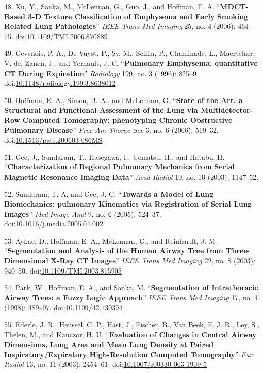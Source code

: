\documentclass[11pt,]{article}
\begin{document}
48. Xu, Y., Sonka, M., McLennan, G., Guo, J., and Hoffman, E. A.
``\textbf{MDCT-Based 3-D Texture Classification of Emphysema and Early
Smoking Related Lung Pathologies}'' \emph{IEEE Trans Med Imaging} 25,
no. 4 (2006): 464--75.
doi:\href{http://dx.doi.org/10.1109/TMI.2006.870889}{10.1109/TMI.2006.870889}

49. Gevenois, P. A., De Vuyst, P., Sy, M., Scillia, P., Chaminade, L.,
Maertelaer, V. de, Zanen, J., and Yernault, J. C. ``\textbf{Pulmonary
Emphysema: quantitative CT During Expiration}'' \emph{Radiology} 199,
no. 3 (1996): 825--9.
doi:\href{http://dx.doi.org/10.1148/radiology.199.3.8638012}{10.1148/radiology.199.3.8638012}

50. Hoffman, E. A., Simon, B. A., and McLennan, G. ``\textbf{State of
the Art. a Structural and Functional Assessment of the Lung via
Multidetector-Row Computed Tomography: phenotyping Chronic Obstructive
Pulmonary Disease}'' \emph{Proc Am Thorac Soc} 3, no. 6 (2006): 519--32.
doi:\href{http://dx.doi.org/10.1513/pats.200603-086MS}{10.1513/pats.200603-086MS}

51. Gee, J., Sundaram, T., Hasegawa, I., Uematsu, H., and Hatabu, H.
``\textbf{Characterization of Regional Pulmonary Mechanics from Serial
Magnetic Resonance Imaging Data}'' \emph{Acad Radiol} 10, no. 10 (2003):
1147--52.

52. Sundaram, T. A. and Gee, J. C. ``\textbf{Towards a Model of Lung
Biomechanics: pulmonary Kinematics via Registration of Serial Lung
Images}'' \emph{Med Image Anal} 9, no. 6 (2005): 524--37.
doi:\href{http://dx.doi.org/10.1016/j.media.2005.04.002}{10.1016/j.media.2005.04.002}

53. Aykac, D., Hoffman, E. A., McLennan, G., and Reinhardt, J. M.
``\textbf{Segmentation and Analysis of the Human Airway Tree from
Three-Dimensional X-Ray CT Images}'' \emph{IEEE Trans Med Imaging} 22,
no. 8 (2003): 940--50.
doi:\href{http://dx.doi.org/10.1109/TMI.2003.815905}{10.1109/TMI.2003.815905}

54. Park, W., Hoffman, E. A., and Sonka, M. ``\textbf{Segmentation of
Intrathoracic Airway Trees: a Fuzzy Logic Approach}'' \emph{IEEE Trans
Med Imaging} 17, no. 4 (1998): 489--97.
doi:\href{http://dx.doi.org/10.1109/42.730394}{10.1109/42.730394}

55. Ederle, J. R., Heussel, C. P., Hast, J., Fischer, B., Van Beek, E.
J. R., Ley, S., Thelen, M., and Kauczor, H. U. ``\textbf{Evaluation of
Changes in Central Airway Dimensions, Lung Area and Mean Lung Density at
Paired Inspiratory/Expiratory High-Resolution Computed Tomography}''
\emph{Eur Radiol} 13, no. 11 (2003): 2454--61.
doi:\href{http://dx.doi.org/10.1007/s00330-003-1909-5}{10.1007/s00330-003-1909-5}
\end{document}
